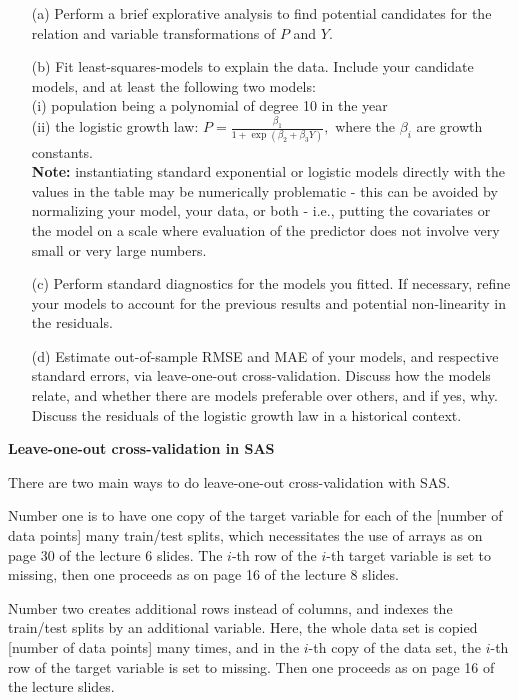 \begin{enumerate}
  \item[(a)] Perform a brief explorative analysis to find potential candidates for the relation and variable transformations of $P$ and $Y$.
  \item[(b)] Fit least-squares-models to explain the data. Include your candidate models, and at least the following two models:\\
    (i) population being a polynomial of degree 10 in the year \\ (ii) the logistic growth law: $P = \frac{\beta_1}{1+\exp(\beta_2+\beta_3 Y)},$
  where the $\beta_i$ are growth constants.\\

  {\bf Note:} instantiating standard exponential or logistic models directly with the values in the table may be numerically problematic - this can be avoided by normalizing your model, your data, or both - i.e., putting the covariates or the model on a scale where evaluation of the predictor does not involve very small or very large numbers.
  \item[(c)] Perform standard diagnostics for the models you fitted. If necessary, refine your models to account for the previous results and potential non-linearity in the residuals.
  \item[(d)] Estimate out-of-sample RMSE and MAE of your models, and respective standard errors, via leave-one-out cross-validation. Discuss how the models relate, and whether there are models preferable over others, and if yes, why. Discuss the residuals of the logistic growth law in a historical context.
\end{enumerate}
\newpage

{\bf Leave-one-out cross-validation in SAS}

There are two main ways to do leave-one-out cross-validation with SAS.

Number one is to have one copy of the target variable for each of the [number of data points] many train/test splits, which necessitates the use of arrays as on page 30 of the lecture 6 slides. The $i$-th row of the $i$-th target variable is set to missing, then one proceeds as on page 16 of the lecture 8 slides.

Number two creates additional rows instead of columns, and indexes the train/test splits by an additional variable. Here, the whole data set is copied [number of data points] many times, and in the $i$-th copy of the data set, the $i$-th row of the target variable is set to missing. Then one proceeds as on page 16 of the lecture slides.

